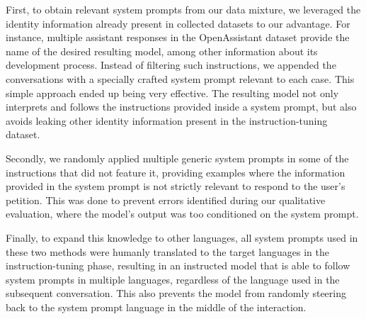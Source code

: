 First, to obtain relevant system prompts from our data mixture, we leveraged the identity information already present in collected datasets to our advantage. For instance, multiple assistant responses in the OpenAssistant \cite{oasst} dataset provide the name of the desired resulting model, among other information about its development process. Instead of filtering such instructions, we appended the conversations with a specially crafted system prompt relevant to each case. This simple approach ended up being very effective. The resulting model not only interprets and follows the instructions provided inside a system prompt, but also avoids leaking other identity information present in the instruction-tuning dataset.

Secondly, we randomly applied multiple generic system prompts in some of the instructions that did not feature it, providing examples where the information provided in the system prompt is not strictly relevant to respond to the user’s petition. This was done to prevent errors identified during our qualitative evaluation, where the model’s output was too conditioned on the system prompt.

Finally, to expand this knowledge to other languages, all system prompts used in these two methods were humanly translated to the target languages in the instruction-tuning phase, resulting in an instructed model that is able to follow system prompts in multiple languages, regardless of the language used in the subsequent conversation. This also prevents the model from randomly steering back to the system prompt language in the middle of the interaction.